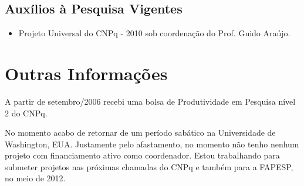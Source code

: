 \documentclass[11pt]{article}
\begin{document}
\subsection{Auxílios à Pesquisa Vigentes}

\begin{itemize}
\item  Projeto Universal do CNPq - 2010 sob coordenação do Prof. Guido Araújo.
\end{itemize}

\section{Outras Informações}

A partir de setembro/2006 recebi uma bolsa de Produtividade em
Pesquisa nível 2 do CNPq.

No momento acabo de retornar de um período sabático na Universidade de
Washington, EUA. Justamente pelo afastamento, no momento não tenho
nenhum projeto com financiamento ativo como coordenador. Estou
trabalhando para submeter projetos nas próximas chamadas do CNPq e
também para a FAPESP, no meio de 2012.
\end{document}
